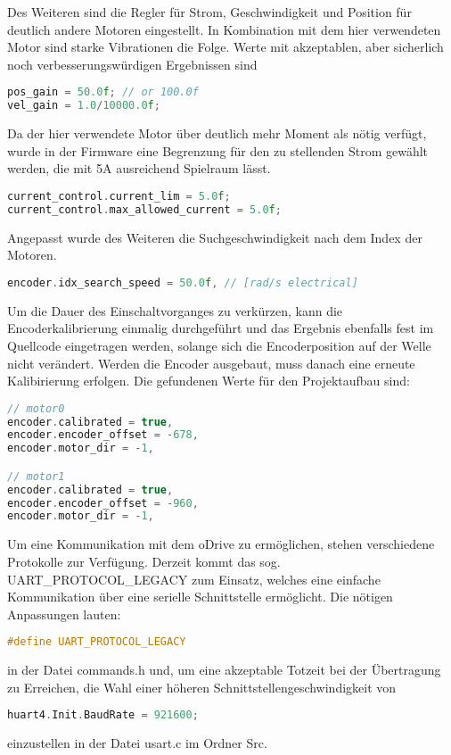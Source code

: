 Des Weiteren sind die Regler für Strom, Geschwindigkeit und Position für deutlich andere Motoren eingestellt. In Kombination mit dem hier verwendeten Motor sind starke Vibrationen die Folge. Werte mit akzeptablen, aber sicherlich noch verbesserungswürdigen Ergebnissen sind
\begin{lstlisting}[language=C++]
pos_gain = 50.0f; // or 100.0f
vel_gain = 1.0/10000.0f;
\end{lstlisting}

Da der hier verwendete Motor über deutlich mehr Moment als nötig verfügt, wurde in der Firmware eine Begrenzung für den zu stellenden Strom gewählt werden, die mit 5A ausreichend Spielraum lässt.
\begin{lstlisting}[language=C++]
current_control.current_lim = 5.0f;
current_control.max_allowed_current = 5.0f;
\end{lstlisting}

Angepasst wurde des Weiteren die Suchgeschwindigkeit nach dem Index der Motoren.
\begin{lstlisting}[language=C++]
encoder.idx_search_speed = 50.0f, // [rad/s electrical]
\end{lstlisting}

Um die Dauer des Einschaltvorganges zu verkürzen, kann die Encoderkalibrierung einmalig durchgeführt und das Ergebnis ebenfalls fest im Quellcode eingetragen werden, solange sich die Encoderposition auf der Welle nicht verändert. Werden die Encoder ausgebaut, muss danach eine erneute Kalibirierung erfolgen. Die gefundenen Werte für den Projektaufbau sind:
\begin{lstlisting}[language=C++]
// motor0
encoder.calibrated = true,
encoder.encoder_offset = -678,
encoder.motor_dir = -1,

// motor1
encoder.calibrated = true,
encoder.encoder_offset = -960,
encoder.motor_dir = -1,
\end{lstlisting}

Um eine Kommunikation mit dem oDrive zu ermöglichen, stehen verschiedene Protokolle zur Verfügung. Derzeit kommt das sog. UART\_PROTOCOL\_LEGACY zum Einsatz, welches eine einfache Kommunikation über eine serielle Schnittstelle ermöglicht. Die nötigen Anpassungen lauten:
\begin{lstlisting}[language=C++]
#define UART_PROTOCOL_LEGACY
\end{lstlisting}
in der Datei commands.h und, um eine akzeptable Totzeit bei der Übertragung zu Erreichen, die Wahl einer höheren Schnittstellengeschwindigkeit von
\begin{lstlisting}[language=C++]
huart4.Init.BaudRate = 921600;
\end{lstlisting}
einzustellen in der Datei usart.c im Ordner Src.

